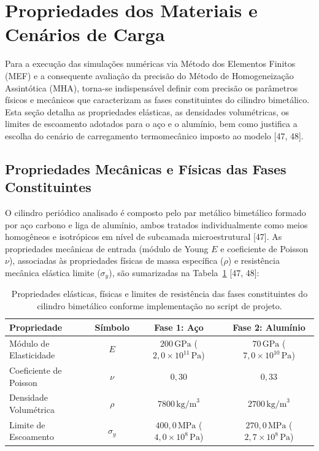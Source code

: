 \section{Propriedades dos Materiais e Cenários de Carga}\label{sec:propriedades_cenarios}

Para a execução das simulações numéricas via Método dos Elementos Finitos (MEF) e a consequente avaliação da precisão do Método de Homogeneização Assintótica (MHA), torna-se indispensável definir com precisão os parâmetros físicos e mecânicos que caracterizam as fases constituintes do cilindro bimetálico. Esta seção detalha as propriedades elásticas, as densidades volumétricas, os limites de escoamento adotados para o aço e o alumínio, bem como justifica a escolha do cenário de carregamento termomecânico imposto ao modelo [47, 48].

\subsection{Propriedades Mecânicas e Físicas das Fases Constituintes}

O cilindro periódico analisado é composto pelo par metálico bimetálico formado por aço carbono e liga de alumínio, ambos tratados individualmente como meios homogêneos e isotrópicos em nível de subcamada microestrutural [47]. As propriedades mecânicas de entrada (módulo de Young $E$ e coeficiente de Poisson $\nu$), associadas às propriedades físicas de massa específica ($\rho$) e resistência mecânica elástica limite ($\sigma_y$), são sumarizadas na Tabela~\ref{tab:propriedades_fases} [47, 48]:

\begin{table}[htbp]
  \centering
  \caption{Propriedades elásticas, físicas e limites de resistência das fases constituintes do cilindro bimetálico conforme implementação no script de projeto.}
  \label{tab:propriedades_fases}
  \begin{tabular}{|l|c|c|c|}
    \hline
    \textbf{Propriedade} & \textbf{Símbolo} & \textbf{Fase 1: Aço} & \textbf{Fase 2: Alumínio} \\ \hline
    Módulo de Elasticidade & $E$ & $200 \, \text{GPa}$ ($2,0 \times 10^{11} \, \text{Pa}$) & $70 \, \text{GPa}$ ($7,0 \times 10^{10} \, \text{Pa}$) \\ \hline
    Coeficiente de Poisson & $\nu$ & $0,30$ & $0,33$ \\ \hline
    Densidade Volumétrica & $\rho$ & $7800 \, \text{kg/m}^3$ & $2700 \, \text{kg/m}^3$ \\ \hline
    Limite de Escoamento & $\sigma_y$ & $400,0 \, \text{MPa}$ ($4,0 \times 10^8 \, \text{Pa}$) & $270,0 \, \text{MPa}$ ($2,7 \times 10^8 \, \text{Pa}$) \\ \hline
  \end{tabular}
\end{table}

